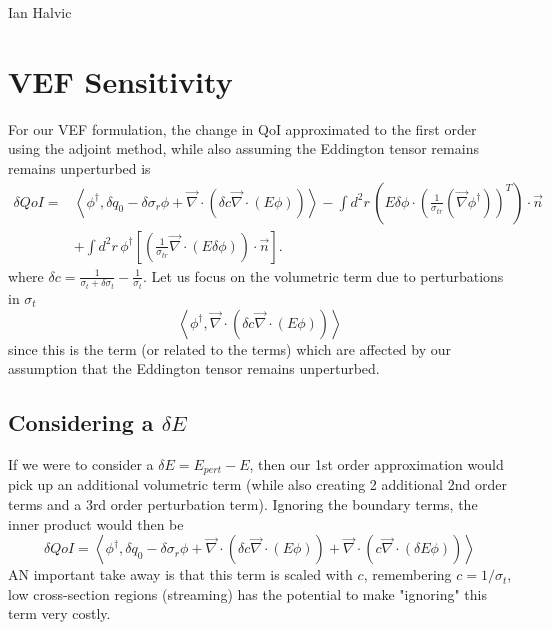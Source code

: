 \documentclass{article}
\newcommand{\bra}{\left\langle}
\newcommand{\ket}{\right\rangle}
\newcommand{\vdiv}{\vec{\nabla} \cdot}
\newcommand{\vgrad}{\vec{\nabla}}
\begin{document}
\begin{center}
Ian Halvic \\
\end{center}

\section{VEF Sensitivity}
For our VEF formulation, the change in QoI approximated to the first order using the adjoint method, while also assuming the Eddington tensor remains remains unperturbed is 
\begin{align*}
\delta QoI =& \bra \phi^\dag , \delta q_0 - \delta \sigma_r \phi + \vdiv \left( \delta c \vdiv \left( E \phi \right) \right)  \ket - \int d^2 r \, \left( E \delta \phi \cdot \left( \frac{1}{ \sigma_{tr}} \left(  \vgrad \phi^\dag \right) \right)^T \right) \cdot \vec{n} \\
&+ \int d^2 r \, \phi^\dag \left[ \left( \frac{1}{\sigma_{tr}} \vdiv \left( E \delta \phi \right) \right) \cdot \vec{n} \right].
\end{align*}
where $\delta c = \frac{1}{\sigma_t + \delta \sigma_t} -  \frac{1}{\sigma_t}$.
Let us focus on the volumetric term due to perturbations in $\sigma_t$
\[
\bra \phi^\dag ,  \vdiv \left( \delta c \vdiv \left( E \phi \right) \right)  \ket
\]
since this is the term (or related to the terms) which are affected by our assumption that the Eddington tensor remains unperturbed.
\subsection{Considering a $\delta E$}
If we were to consider a $\delta E = E_{pert} - E$, then our 1st order approximation would pick up an additional volumetric term (while also creating 2 additional 2nd order terms and a 3rd order perturbation term). Ignoring the boundary terms, the inner product would then be
\[
\delta QoI = \bra \phi^\dag , \delta q_0 - \delta \sigma_r \phi + \vdiv \left( \delta c \vdiv \left( E \phi \right) \right) + \vdiv \left( c \vdiv \left( \delta E \phi \right) \right)  \ket
\]
AN important take away is that this term is scaled with $c$, remembering $c=1/\sigma_t$, low cross-section regions (streaming) has the potential to make "ignoring" this term very costly.
\end{document}
